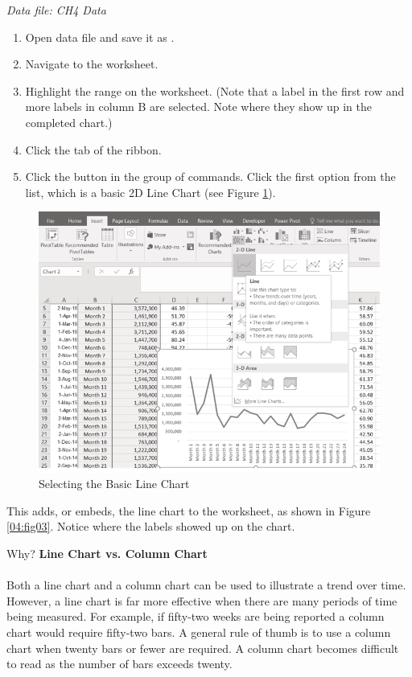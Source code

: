 \textit{Data file: CH4 Data}

\begin{enumerate}
	\item Open data file  and save it as .
	\item Navigate to the  worksheet.
	\item Highlight the range  on the  worksheet. (Note that a label in the first row and more labels in column B are selected. Note where they show up in the completed chart.)
	\item Click the  tab of the ribbon.
	\item Click the  button in the  group of commands. Click the first option from the list, which is a basic 2D Line Chart (see Figure \ref{04:fig02}).
\end{enumerate}

\begin{figure}[H]
	\centering
	\includegraphics[width=\maxwidth{.95\linewidth}]{gfx/ch04_fig02}
	\caption{Selecting the Basic Line Chart}
	\label{04:fig02}
\end{figure}

This adds, or embeds, the line chart to the worksheet, as shown in Figure \ref{04:fig03}. Notice where the labels showed up on the chart.

\begin{center}
	\begin{infobox}{Why?}
		\textbf{Line Chart vs. Column Chart}
		\\
		\\
		Both a line chart and a column chart can be used to illustrate a trend over time. However, a line chart is far more effective when there are many periods of time being measured. For example, if fifty-two weeks are being reported a column chart would require fifty-two bars. A general rule of thumb is to use a column chart when twenty bars or fewer are required. A column chart becomes difficult to read as the number of bars exceeds twenty.
	\end{infobox}
\end{center}

